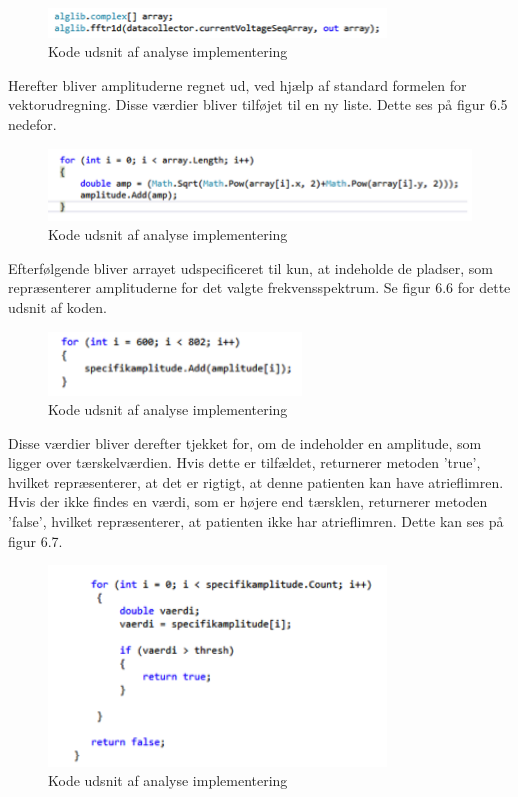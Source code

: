 \begin{figure}[H]
	\centering
	\includegraphics[width=0.8\textwidth]{Figurer/Snip20150525_41}
	\caption{Kode udsnit af analyse implementering}
\end{figure}

Herefter bliver amplituderne regnet ud, ved hjælp af standard formelen for vektorudregning. Disse værdier bliver tilføjet til en ny liste. Dette ses på figur 6.5 nedefor.

\begin{figure}[H]
	\centering
	\includegraphics[width=1\textwidth]{Figurer/Snip20150525_43}
	\caption{Kode udsnit af analyse implementering}
\end{figure}

Efterfølgende bliver arrayet udspecificeret til kun, at indeholde de pladser, som repræsenterer amplituderne for det valgte frekvensspektrum. Se figur 6.6 for dette udsnit af koden.  

\begin{figure}[H]
	\centering
	\includegraphics[width=0.6\textwidth]{Figurer/Snip20150525_44}
	\caption{Kode udsnit af analyse implementering}
\end{figure}

Disse værdier bliver derefter tjekket for, om de indeholder en amplitude, som ligger over tærskelværdien. Hvis dette er tilfældet, returnerer metoden ’true’, hvilket repræsenterer, at det er rigtigt, at denne patienten kan have atrieflimren. Hvis der ikke findes en værdi, som er højere end tærsklen, returnerer metoden ’false’, hvilket repræsenterer, at patienten ikke har atrieflimren. Dette kan ses på figur 6.7. 

\begin{figure}[H]
	\centering
	\includegraphics[width=0.8\textwidth]{Figurer/Snip20150525_47}
	\caption{Kode udsnit af analyse implementering}
\end{figure}

